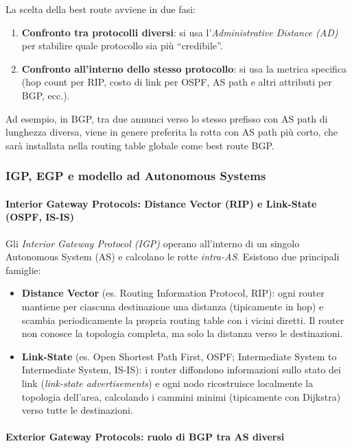 La scelta della best route avviene in due fasi:
\begin{enumerate}
    \item \textbf{Confronto tra protocolli diversi}: si usa l'\emph{Administrative Distance (AD)} per stabilire quale protocollo sia più “credibile”.
    \item \textbf{Confronto all’interno dello stesso protocollo}: si usa la metrica specifica (hop count per RIP, costo di link per OSPF, AS path e altri attributi per BGP, ecc.).
\end{enumerate}

Ad esempio, in BGP, tra due annunci verso lo stesso prefisso con AS path di lunghezza diversa, viene in genere preferita la rotta con AS path più corto, che sarà installata nella routing table globale come best route BGP.

\subsubsection{IGP, EGP e modello ad Autonomous Systems}

\paragraph{Interior Gateway Protocols: Distance Vector (RIP) e Link-State (OSPF, IS-IS)}

Gli \emph{Interior Gateway Protocol (IGP)} operano all’interno di un singolo Autonomous System (AS) e calcolano le rotte \emph{intra-AS}. Esistono due principali famiglie:

\begin{itemize}
    \item \textbf{Distance Vector} (es. Routing Information Protocol, RIP): ogni router mantiene per ciascuna destinazione una distanza (tipicamente in hop) e scambia periodicamente la propria routing table con i vicini diretti. Il router non conosce la topologia completa, ma solo la distanza verso le destinazioni.
    \item \textbf{Link-State} (es. Open Shortest Path First, OSPF; Intermediate System to Intermediate System, IS-IS): i router diffondono informazioni sullo stato dei link (\emph{link-state advertisements}) e ogni nodo ricostruisce localmente la topologia dell’area, calcolando i cammini minimi (tipicamente con Dijkstra) verso tutte le destinazioni.
\end{itemize}

\paragraph{Exterior Gateway Protocols: ruolo di BGP tra AS diversi}

